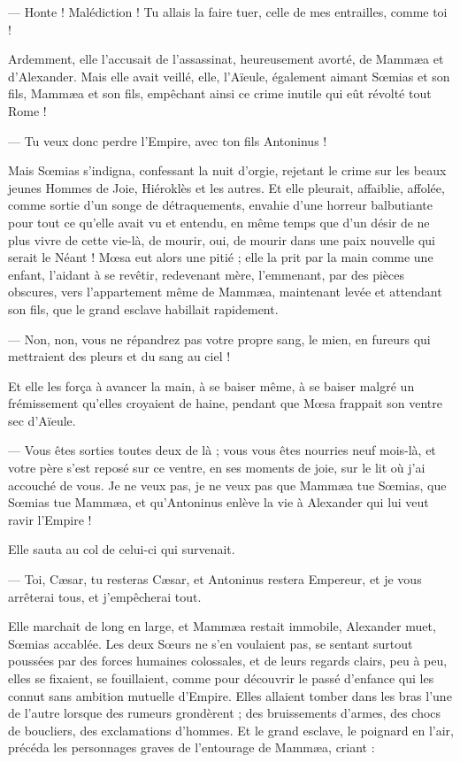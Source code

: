 \documentclass[a4paper, 11pt, oneside, polutonikogreek, french]{article}
\begin{document}
--- Honte ! Malédiction ! Tu allais la faire tuer, celle de mes entrailles, comme toi !

Ardemment, elle l'accusait de l'assassinat, heureusement avorté, de Mammæa et d'Alexander. Mais elle avait veillé, elle, l'Aïeule, également aimant Sœmias et son fils, Mammæa et son fils, empêchant ainsi ce crime inutile qui eût révolté tout Rome !

--- Tu veux donc perdre l'Empire, avec ton fils Antoninus !

Mais Sœmias s'indigna, confessant la nuit d'orgie, rejetant le crime sur les beaux jeunes Hommes de Joie, Hiéroklès et les autres. Et elle pleurait, affaiblie, affolée, comme sortie d'un songe de détraquements, envahie d'une horreur balbutiante pour tout ce qu'elle avait vu et entendu, en même temps que d'un désir de ne plus vivre de cette vie-là, de mourir, oui, de mourir dans une paix nouvelle qui serait le Néant ! Mœsa eut alors une pitié ; elle la prit par la main comme une enfant, l'aidant à se revêtir, redevenant mère, l'emmenant, par des pièces obscures, vers l'appartement même de Mammæa, maintenant levée et attendant son fils, que le grand esclave habillait rapidement.

--- Non, non, vous ne répandrez pas votre propre sang, le mien, en fureurs qui mettraient des pleurs et du sang au ciel !

Et elle les força à avancer la main, à se baiser même, à se baiser malgré un frémissement qu'elles croyaient de haine, pendant que Mœsa frappait son ventre sec d'Aïeule.

--- Vous êtes sorties toutes deux de là ; vous vous êtes nourries neuf mois-là, et votre père s'est reposé sur ce ventre, en ses moments de joie, sur le lit où j'ai accouché de vous. Je ne veux pas, je ne veux pas que Mammæa tue Sœmias, que Sœmias tue Mammæa, et qu'Antoninus enlève la vie à Alexander qui lui veut ravir l'Empire !

Elle sauta au col de celui-ci qui survenait.

--- Toi, Cæsar, tu resteras Cæsar, et Antoninus restera Empereur, et je vous arrêterai tous, et j'empêcherai tout.

Elle marchait de long en large, et Mammæa restait immobile, Alexander muet, Sœmias accablée. Les deux Sœurs ne s'en voulaient pas, se sentant surtout poussées par des forces humaines colossales, et de leurs regards clairs, peu à peu, elles se fixaient, se fouillaient, comme pour découvrir le passé d'enfance qui les connut sans ambition mutuelle d'Empire. Elles allaient tomber dans les bras l'une de l'autre lorsque des rumeurs grondèrent ; des bruissements d'armes, des chocs de boucliers, des exclamations d'hommes. Et le grand esclave, le poignard en l'air, précéda les personnages graves de l'entourage de Mammæa, criant :
\end{document}
